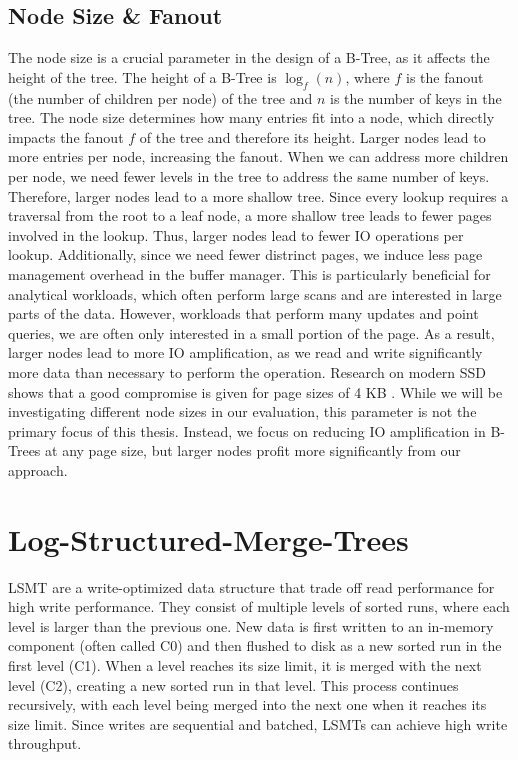 
\subsection*{Node Size \& Fanout}
\label{sec:node-size-fanout}
The node size is a crucial parameter in the design of a B-Tree, as it affects the height of the tree.
The height of a B-Tree is $\log_f(n)$, where $f$ is the fanout (the number of children per node) of the tree and $n$ is the number of keys in the tree.
The node size determines how many entries fit into a node, which directly impacts the fanout $f$ of the tree and therefore its height.
Larger nodes lead to more entries per node, increasing the fanout. 
When we can address more children per node, we need fewer levels in the tree to address the same number of keys.
Therefore, larger nodes lead to a more shallow tree. 
Since every lookup requires a traversal from the root to a leaf node, a more shallow tree leads to fewer pages involved in the lookup.
Thus, larger nodes lead to fewer \ac{IO} operations per lookup.
Additionally, since we need fewer distrinct pages, we induce less page management overhead in the buffer manager.
This is particularly beneficial for analytical workloads, which often perform large scans and are interested in large parts of the data.
However, workloads that perform many updates and point queries, we are often only interested in a small portion of the page.
As a result, larger nodes lead to more \ac{IO} amplification, as we read and write significantly more data than necessary to perform the operation.
Research on modern \ac{SSD} shows that a good compromise is given for page sizes of 4 KB \cite{haas2023modern}.
While we will be investigating different node sizes in our evaluation, this parameter is not the primary focus of this thesis.
Instead, we focus on reducing \ac{IO} amplification in B-Trees at any page size, but larger nodes profit more significantly from our approach.


\section{Log-Structured-Merge-Trees}
\ac{LSMT} \cite{oneil1996log} are a write-optimized data structure that trade off read performance for high write performance.
They consist of multiple levels of sorted runs, where each level is larger than the previous one.
New data is first written to an in-memory component (often called C0) and then flushed to disk as a new sorted run in the first level (C1).
When a level reaches its size limit, it is merged with the next level (C2), creating a new sorted run in that level.
This process continues recursively, with each level being merged into the next one when it reaches its size limit.
Since writes are sequential and batched, \ac{LSMT}s can achieve high write throughput.

